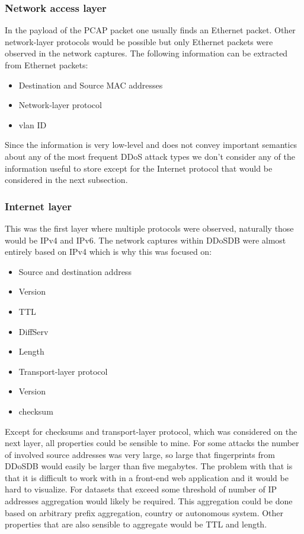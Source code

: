 \subsubsection{Network access layer}
In the payload of the PCAP packet one usually finds an Ethernet packet. Other network-layer protocols would be possible but only Ethernet packets were observed in the network captures.
The following information can be extracted from Ethernet packets:
\begin{itemize}
\item Destination and Source MAC addresses
\item Network-layer protocol
\item vlan ID
\end{itemize}
Since the information is very low-level and does not convey important semantics about any of the most frequent DDoS attack types we don't consider any of the information useful to store except for the Internet protocol that would be considered in the next subsection.
\subsubsection{Internet layer}
This was the first layer where multiple protocols were observed, naturally those would be IPv4 and IPv6. The network captures within DDoSDB were almost entirely based on IPv4 which is why this was focused on:
\begin{itemize}
\item Source and destination address
\item Version
\item TTL
\item DiffServ
\item Length
\item Transport-layer protocol
\item Version
\item checksum
\end{itemize}
     Except for checksums and transport-layer protocol, which was considered on the next layer, all properties could be sensible to mine.
     For some attacks the number of involved source addresses was very large, so large that fingerprints from DDoSDB would easily be larger than five megabytes. The problem with that is that it is difficult to work with in a front-end web application and it would be hard to visualize. For datasets that exceed some threshold of number of IP addresses aggregation would likely be required. This aggregation could be done based on arbitrary prefix aggregation, country or autonomous system.
     Other properties that are also sensible to aggregate would be TTL and length.
